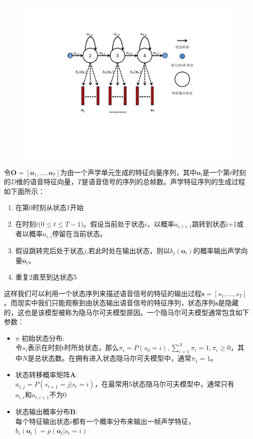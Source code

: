 \begin{figure}[!htp]
  \centering
    \captionstyle{\centering}
    \includegraphics[trim = 3cm 5cm 4cm 3cm, clip=true, width=.7\textwidth]{figure/hmm.pdf}
\end{figure}

令$\mathbf{O}=[\mathbf{o}_1, ..., \mathbf{o}_T]$为由一个声学单元生成的特征向量序列，其中$\mathbf{o}_t$是一个第$t$时刻的$D$维的语音特征向量，$T$是语音信号的序列的总帧数。声学特征序列的生成过程如下面所示：
\begin{enumerate}
    \item 在第0时刻从状态1开始
    \item 在时刻$t$($0 \le t \le T-1$)。假设当前处于状态$i$，以概率$a_{i,i+1}$跳转到状态i+1或者以概率$a_{i,i}$停留在当前状态。
    \item 假设跳转完后处于状态$j$,若此时处在输出状态，则以$b_j(\mathbf{o}_t)$的概率输出声学向量$\mathbf{o}_t$。
    \item 重复2直至到达状态5
\end{enumerate}

这样我们可以利用一个状态序列来描述语音信号的特征的输出过程$\mathbf{s}=[s_1, ..., s_T]$。而现实中我们只能观察到由状态输出语音信号的特征序列，状态序列$\mathbf{s}$是隐藏的，这也是该模型被称为隐马尔可夫模型原因。一个隐马尔可夫模型通常包含如下参数：
\begin{itemize}
    \item $\pi$ 初始状态分布: \\
    令$s_t$表示在时刻t时所处状态，那么$\pi_i = P(s_0=i), \sum_{i=1}^N \pi_i = 1, \pi_i \ge 0$，其中$N$是总状态数。在拥有进入状态隐马尔可夫模型中，通常$\pi_1=1$。
    \item 状态转移概率矩阵$\mathbf{A}$: \\
    $a_{i,j}=P(s_{t+1}=j|s_t=i)$，在最常用5状态隐马尔可夫模型中，通常只有$a_{i,i}和a_{i,i+1}$不为0
    \item 状态输出概率分布$\mathbf{B}$: \\
    每个特征输出状态$i$都有一个概率分布来输出一帧声学特征，$b_i(\mathbf{o}_t)=p(\mathbf{o}_t|s_t=i)$
\end{itemize}

